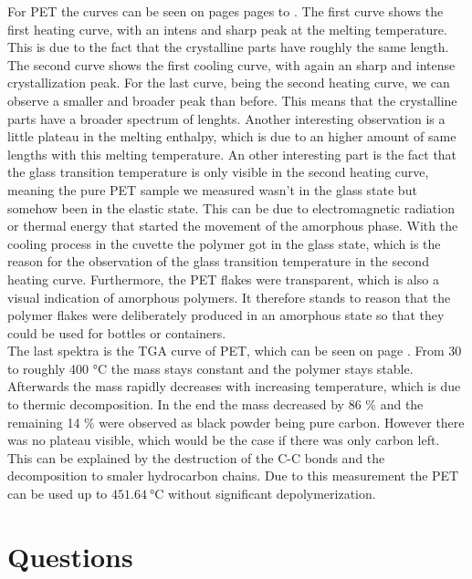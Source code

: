 \documentclass[10pt,a4paper,ngerman]{scrartcl}
\begin{document}
    For PET the curves can be seen on pages pages \pageref{pdf:pet-1hc} to \pageref{pdf:pet-2hc}. The first curve shows the first heating curve, with
    an intens and sharp peak at the melting temperature. This is due to the fact that the crystalline parts have roughly the same length.
    The second curve shows the first cooling curve, with again an sharp and intense crystallization peak. For the last curve, being the second 
    heating curve, we can observe a smaller and broader peak than before. This means that the crystalline parts have a broader spectrum of lenghts.
    Another interesting observation is a little plateau in the melting enthalpy, which is due to an higher amount of same lengths with this 
    melting temperature. 
    An other interesting part is the fact that the glass transition temperature is only visible in the second heating curve, meaning the pure PET 
    sample we measured wasn't in the glass state but somehow been in the elastic state. \cite{polyskript} This can be due to electromagnetic radiation or 
    thermal energy that started the movement of the amorphous phase. With the cooling process in the cuvette the polymer got in the glass state, which is 
    the reason for the observation of the glass transition temperature in the second heating curve. Furthermore, the PET flakes were transparent, which is 
    also a visual indication of amorphous polymers. It therefore stands to reason that the polymer flakes were deliberately produced in an amorphous state 
    so that they could be used for bottles or containers.\\

    The last spektra is the TGA curve of PET, which can be seen on page \pageref{pdf:pet-tga}. From 30 to roughly 400 °C the mass stays constant 
    and the polymer stays stable. Afterwards the mass rapidly decreases with increasing temperature, which is due to thermic decomposition. In the end 
    the mass decreased by 86 \% and the remaining 14 \% were observed as black powder being pure carbon.
    However there was no plateau visible, which would be the case if there was only carbon left. 
    This can be explained by the destruction of the C-C bonds and the decomposition to smaler hydrocarbon chains. 
    Due to this measurement the PET can be 
    used up to $\SI{451.64}{\degreeCelsius}$ without significant depolymerization.






\section{Questions}
\end{document}
